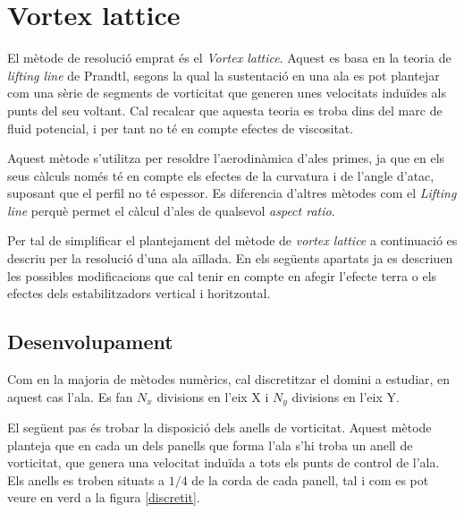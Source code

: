 \chapter{Vortex lattice}

El mètode de resolució emprat és el \textit{Vortex lattice}. Aquest es basa en la teoria de \textit{lifting line} de Prandtl, segons la qual la sustentació en una ala es pot plantejar com una sèrie de segments de vorticitat que generen unes velocitats induïdes als punts del seu voltant. Cal recalcar que aquesta teoria es troba dins del marc de fluid potencial, i per tant no té en compte efectes de viscositat.

Aquest mètode s'utilitza per resoldre l'aerodinàmica d'ales primes, ja que en els seus càlculs només té en compte els efectes de la curvatura i de l'angle d'atac, suposant que el perfil no té espessor. Es diferencia d'altres mètodes com el \textit{Lifting line} perquè permet el càlcul d'ales de qualsevol \textit{aspect ratio}.

Per tal de simplificar el plantejament del mètode de \textit{vortex lattice} a continuació es descriu per la resolució d'una ala aïllada. En els següents apartats ja es descriuen les possibles modificacions que cal tenir en compte en afegir l'efecte terra o els efectes dels estabilitzadors vertical i horitzontal.

\section{Desenvolupament}

Com en la majoria de mètodes numèrics, cal discretitzar el domini a estudiar, en aquest cas l'ala. Es fan $N_{x}$ divisions en l'eix X i $N_{y}$ divisions en l'eix Y.

El següent pas és trobar la disposició dels anells de vorticitat. Aquest mètode planteja que en cada un dels panells que forma l'ala s'hi troba un anell de vorticitat, que genera una velocitat induïda a tots els punts de control de l'ala. Els anells es troben situats a $1/4$ de la corda de cada panell, tal i com es pot veure en verd a la figura \ref{discretit}.

